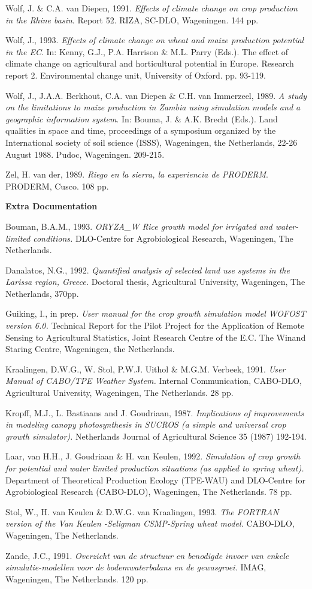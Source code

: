 Wolf, J. \& C.A. van Diepen, 1991. {\it Effects of climate change on crop production in the Rhine basin\/}.
Report 52. RIZA, SC-DLO, Wageningen. 144 pp.

Wolf, J., 1993. {\it Effects of climate change on wheat and maize production potential in the EC\/}. In:
Kenny, G.J., P.A. Harrison \& M.L. Parry (Eds.). The effect of climate change on agricultural and
horticultural potential in Europe. Research report 2. Environmental change unit, University of
Oxford. pp. 93-119.

Wolf, J., J.A.A. Berkhout, C.A. van Diepen \& C.H. van {\nobreak}Immerzeel, 1989. {\it A study on the
limitations to maize production in Zambia using simulation models and a geo\-graphic information
system\/}. In: Bouma, J. \& A.K. Brecht (Eds.). Land qualities in space and time, proceedings of a
symposium organized by the International society of soil science (ISSS), Wageningen, the
Netherlands, 22-26 August 1988. Pudoc, Wageningen. 209-215.

Zel, H. van der, 1989. {\it Riego en la sierra, la experiencia de PRODERM\/}. PRODERM, Cusco. 108
pp.

\newpage
{\bf Extra Documentation}

Bouman, B.A.M., 1993. {\it ORYZA\_W Rice growth model for irrigated and water-limited conditions.\/}
DLO-Centre for Agrobiological Research, Wageningen, The Netherlands.

Danalatos, N.G., 1992. {\it Quantified analysis of selected land use systems in the Larissa region,
Greece.\/} Doctoral thesis, Agricultural University, Wageningen, The Netherlands, 370pp.

Guiking, I., in prep. {\it User manual for the crop growth simulation model WOFOST version 6.0.\/}
Technical Report for the Pilot Project for the Application of Remote Sensing to Agricultural
Statistics, Joint Research Centre of the E.C. The Winand Staring Centre, Wageningen, the
Netherlands.

Kraalingen, D.W.G., W. Stol, P.W.J. Uithol \& M.G.M. Verbeek, 1991. {\it User Manual of
CABO/TPE Weather System.\/} Internal Communication, CABO-DLO, Agricultural University,
Wageningen, The Netherlands. 28 pp.

Kropff, M.J., L. Bastiaans and J. Goudriaan, 1987. {\it Implications of improvements in modeling canopy
photosynthesis in SUCROS (a simple and universal crop growth simulator).\/} Netherlands Journal of
Agricultural Science 35 (1987) 192-194.

Laar, van H.H., J. Goudriaan \& H. van Keulen, 1992. {\it Simulation of crop growth for potential and
water limited production situations (as applied to spring wheat).\/} Department of Theoretical
Production Ecology (TPE-WAU) and DLO-Centre for Agrobiological Research (CABO-DLO),
Wageningen, The Netherlands. 78 pp.

Stol, W., H. van Keulen \& D.W.G. van Kraalingen, 1993. {\it The FORTRAN version of the Van Keulen
-Seligman CSMP-Spring wheat model.\/} CABO-DLO, Wageningen, The Netherlands.

Zande, J.C., 1991. {\it Overzicht van de structuur en benodigde invoer van enkele simulatie-modellen
voor de bodemwaterbalans en de gewasgroei.\/} IMAG, Wageningen, The Netherlands. 120 pp.

